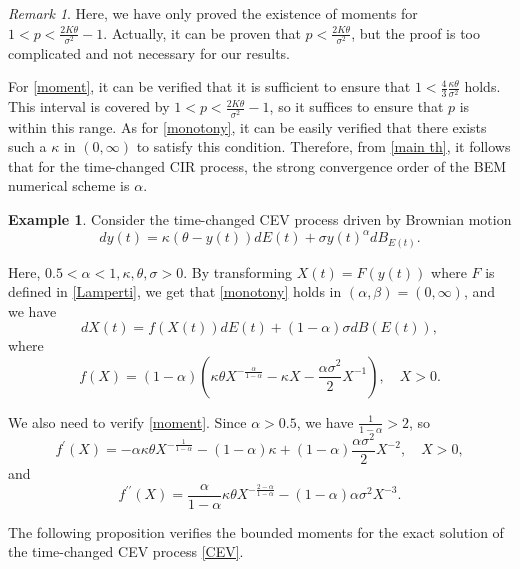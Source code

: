 \documentclass[10pt,reqno,final]{amsart}
\theoremstyle{plain}
\theoremstyle{definition}
\newtheorem{example}{Example}
\theoremstyle{remark}
\newtheorem{remark}{Remark}[section]
\numberwithin{equation}{section}
\numberwithin{figure}{section}
\numberwithin{table}{section}
\begin{document}
\begin{remark}
	Here, we have only proved the existence of moments for $1 < p < \frac{2K\theta}{\sigma^2} - 1$. Actually, it can be proven that $p < \frac{2K\theta}{\sigma^2}$, but the proof is too complicated and not necessary for our results.
\end{remark}
For \cref{moment}, it can be verified that it is sufficient to ensure that $1 < \frac{4}{3}\frac{\kappa\theta}{\sigma^2}$ holds. This interval is covered by $1 < p < \frac{2K\theta}{\sigma^2} - 1$, so it suffices to ensure that $p$ is within this range. As for \cref{monotony}, it can be easily verified that there exists such a $\kappa$ in $(0, \infty)$ to satisfy this condition. Therefore, from \cref{main th}, it follows that for the time-changed CIR process, the strong convergence order of the BEM numerical scheme is $\alpha$.


\begin{example}
	Consider the time-changed CEV process driven by Brownian motion
	\begin{equation}\label{CEV}
		dy(t)=\kappa(\theta-y(t))dE(t)+\sigma y(t)^\alpha dB_{E(t)}.
	\end{equation}
\end{example}

Here, $0.5 < \alpha < 1, \kappa, \theta, \sigma > 0$. By transforming $X(t)=F(y(t))$ where $F$ is defined in \cref{Lamperti}, we get that \cref{monotony} holds in $(\alpha, \beta) = (0, \infty)$, and we have
$$dX(t)=f(X(t))dE(t)+(1-\alpha)\sigma dB(E(t)),$$
where
$$f(X)=(1-\alpha)\left(\kappa\theta X^{-\frac{\alpha}{1-\alpha}}-\kappa X-\frac{\alpha\sigma^2}{2}X^{-1}\right),\quad X>0.$$

We also need to verify \cref{moment}. Since $\alpha > 0.5$, we have $\frac{1}{1-\alpha} > 2$, so
$$f^{\prime}(X)=-\alpha\kappa\theta X^{-\frac{1}{1-\alpha}}-(1-\alpha)\kappa+(1-\alpha)\frac{\alpha\sigma^2}{2}X^{-2},\quad X>0,$$
and
$$f^{\prime\prime}(X)=\frac{\alpha}{1-\alpha}\kappa\theta X^{-\frac{2-\alpha}{1-\alpha}}-(1-\alpha)\alpha\sigma^2X^{-3}.$$

The following proposition verifies the bounded moments for the exact solution of the time-changed CEV process \cref{CEV}.
\end{document}

